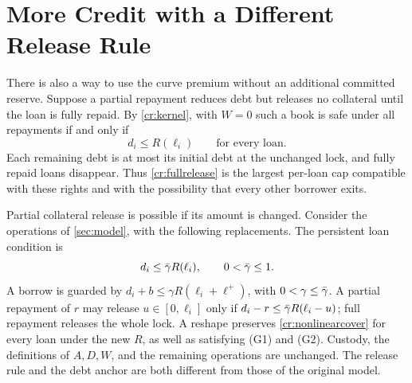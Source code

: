 \section{More Credit with a Different Release Rule}\label{cr:nonlinear}


There is also a way to use the curve premium without an additional committed reserve. Suppose a partial repayment reduces debt but releases no collateral until the loan is fully repaid. By \cref{cr:kernel}, with $W=0$ such a book is safe under all repayments if and only if
\begin{equation}\label{cr:fullrelease}
d_i\le R(\ell_i)\qquad\text{for every loan}.
\end{equation}
Each remaining debt is at most its initial debt at the unchanged lock, and fully repaid loans disappear. Thus \eqref{cr:fullrelease} is the largest per-loan cap compatible with these rights and with the possibility that every other borrower exits.

Partial collateral release is possible if its amount is changed. Consider the operations of \cref{sec:model}, with the following replacements. The persistent loan condition is
\begin{equation}\label{cr:nonlinearcover}
d_i\le\bar\gamma R(\ell_i),\qquad 0<\bar\gamma\le1.
\end{equation}
A borrow is guarded by $d_i+b\le\gamma R(\ell_i+\ell^+)$, with $0<\gamma\le\bar\gamma$. A partial repayment of $r$ may release $u\in[0,\ell_i]$ only if $d_i-r\le\bar\gamma R(\ell_i-u)$; full repayment releases the whole lock. A reshape preserves \eqref{cr:nonlinearcover} for every loan under the new $R$, as well as satisfying (G1) and (G2). Custody, the definitions of $A,D,W$, and the remaining operations are unchanged. The release rule and the debt anchor are both different from those of the original model.

